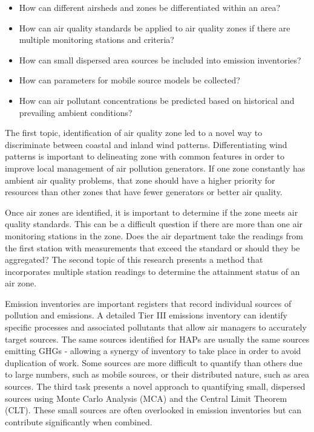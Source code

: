 \begin{itemize}
\item{How can different airsheds and zones be differentiated within an area?}
\item{How can air quality standards be applied to air quality zones if there are multiple monitoring stations and criteria?}
\item{How can small dispersed area sources be included into emission inventories?}
\item{How can parameters for mobile source models be collected?}
\item{How can air pollutant concentrations be predicted based on historical and prevailing ambient conditions?}
\end{itemize}

The first topic, identification of air quality zone led to a novel way to discriminate between coastal and inland wind patterns. Differentiating wind patterns is important to delineating zone with common features in order to improve local management of air pollution generators.  If one zone constantly has ambient air quality problems, that zone should have a higher priority for resources than other zones that have fewer generators or better air quality.

Once air zones are identified, it is important to determine if the zone meets air quality standards. This can be a difficult question if there are more than one air monitoring stations in the zone. Does the air department take the readings from the first station with measurements that exceed the standard or should they be aggregated? The second topic of this research presents a method that incorporates multiple station readings to determine the attainment status of an air zone.  

Emission inventories are important registers that record individual sources of pollution and emissions. A detailed Tier III emissions inventory can identify specific processes and associated pollutants that allow air managers to accurately target sources. The same sources identified for HAPs are usually the same sources emitting GHGs - allowing a synergy of inventory to take place in order to avoid duplication of work. Some sources are more difficult to quantify than others due to large numbers, such as mobile sources, or their distributed nature, such as area sources. The third task presents a novel approach to quantifying small, dispersed sources using Monte Carlo Analysis (MCA) and the Central Limit Theorem (CLT). These small sources are often overlooked in emission inventories but can contribute significantly when combined.

